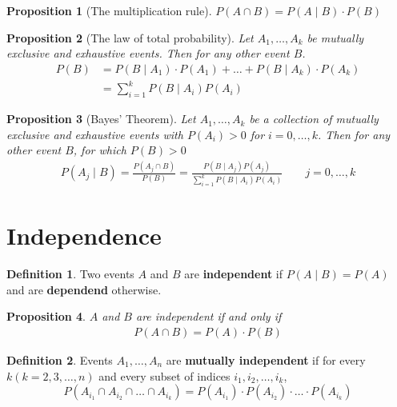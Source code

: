 \documentclass[a4paper]{report}
\theoremstyle{definition}
\newtheorem{definition}{Definition}
\theoremstyle{plain}
\newtheorem{prop}{Proposition}
\begin{document}
\begin{prop}[The multiplication rule]
  $P(A \cap B) = P(A \mid B) \cdot P(B)$
\end{prop}

\begin{prop}[The law of total probability]
  Let $A_1, \dots, A_k$ be mutually exclusive and exhaustive events. Then for any other event $B$.
  \begin{align*}
    P(B)&= P(B \mid A_1) \cdot P(A_1) + \dots + P(B \mid A_k) \cdot P(A_k)\\
        &= \sum\limits_{i=1}^{k} P(B \mid A_i)P(A_i)
  \end{align*}
\end{prop}

\begin{prop}[Bayes' Theorem]
  Let $A_1, \dots, A_k$ be a collection of mutually exclusive and exhaustive
  events with $P(A_i) > 0$ for $i = 0,\dots,k$. Then for any other event $B$,
  for which $P(B) > 0$
  \begin{align*}
    P(A_j \mid B) = \frac{P(A_j \cap B)}{P(B)} = \frac{P(B \mid A_j)P(A_j)}{\sum\limits_{i=1}^k P(B \mid A_i)P(A_i)} \qquad j = 0,\dots,k
  \end{align*}
\end{prop}

\section{Independence}
\begin{definition}
  Two events $A$ and $B$ are \textbf{independent} if $P(A \mid B) = P(A)$ and
  are \textbf{dependend} otherwise.
\end{definition}

\begin{prop}
  $A$ and $B$ are independent if and only if
  \begin{align*}
    P(A \cap B) = P(A) \cdot P(B)  
  \end{align*}
\end{prop}

\begin{definition}
  Events $A_1, \dots, A_n$ are \textbf{mutually independent} if for
  every $k (k = 2, 3, \dots, n)$ and every subset of indices $i_1, i_2,
  \dots, i_k$, 
  \begin{equation}
    P(A_{i_1} \cap A_{i_2} \cap \dots \cap A_{i_k}) = P(A_{i_1})\cdot
    P(A_{i_2})
    \cdot \dots \cdot P(A_{i_k})
  \end{equation}
\end{definition}
\end{document}
